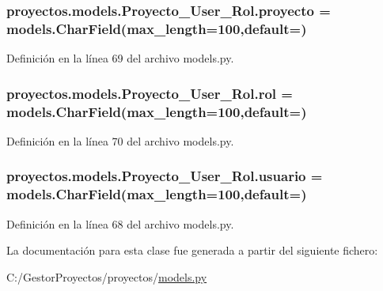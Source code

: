 \subsubsection[{\texorpdfstring{proyecto}{proyecto}}]{\setlength{\rightskip}{0pt plus 5cm}proyectos.\+models.\+Proyecto\+\_\+\+User\+\_\+\+Rol.\+proyecto = models.\+Char\+Field(max\+\_\+length=100,default=\textquotesingle{}\textquotesingle{})\hspace{0.3cm}{\ttfamily [static]}}\hypertarget{classproyectos_1_1models_1_1_proyecto___user___rol_a8826ac82dc33f736475e19a70900bf2e}{}\label{classproyectos_1_1models_1_1_proyecto___user___rol_a8826ac82dc33f736475e19a70900bf2e}


Definición en la línea 69 del archivo models.\+py.

\subsubsection[{\texorpdfstring{rol}{rol}}]{\setlength{\rightskip}{0pt plus 5cm}proyectos.\+models.\+Proyecto\+\_\+\+User\+\_\+\+Rol.\+rol = models.\+Char\+Field(max\+\_\+length=100,default=\textquotesingle{}\textquotesingle{})\hspace{0.3cm}{\ttfamily [static]}}\hypertarget{classproyectos_1_1models_1_1_proyecto___user___rol_a9734b6228a956c010d5af0ba68466954}{}\label{classproyectos_1_1models_1_1_proyecto___user___rol_a9734b6228a956c010d5af0ba68466954}


Definición en la línea 70 del archivo models.\+py.

\subsubsection[{\texorpdfstring{usuario}{usuario}}]{\setlength{\rightskip}{0pt plus 5cm}proyectos.\+models.\+Proyecto\+\_\+\+User\+\_\+\+Rol.\+usuario = models.\+Char\+Field(max\+\_\+length=100,default=\textquotesingle{}\textquotesingle{})\hspace{0.3cm}{\ttfamily [static]}}\hypertarget{classproyectos_1_1models_1_1_proyecto___user___rol_a212532a667651bc8579d785dc09c99aa}{}\label{classproyectos_1_1models_1_1_proyecto___user___rol_a212532a667651bc8579d785dc09c99aa}


Definición en la línea 68 del archivo models.\+py.



La documentación para esta clase fue generada a partir del siguiente fichero\+:\begin{DoxyCompactItemize}
\item 
C\+:/\+Gestor\+Proyectos/proyectos/\hyperlink{proyectos_2models_8py}{models.\+py}\end{DoxyCompactItemize}
